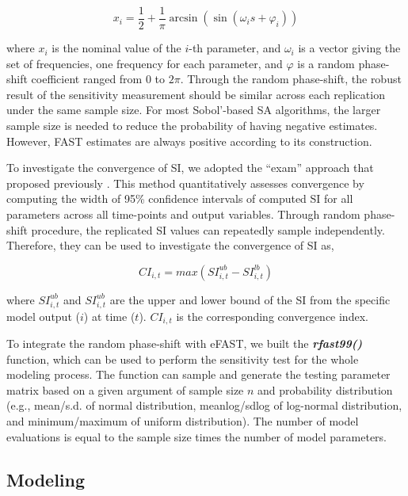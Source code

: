 \documentclass[preprint,12pt, a4paper]{elsarticle}
\begin{document}
\[ x_i = \frac{1}{2} + \frac{1}{\pi}\arcsin(\sin(\omega_is + \varphi_i)) \]


where \(x_i\) is the nominal value of the \(i\)-th parameter, and
\(\omega_i\) is a vector giving the set of frequencies, one frequency
for each parameter, and \(\varphi\) is a random phase-shift coefficient
ranged from 0 to \(2\pi\). Through the random
phase-shift, the robust result of the sensitivity measurement should be
similar across each replication under the same sample size. For most
Sobol'-based SA algorithms, the larger sample size is needed to reduce
the probability of having negative estimates. However, FAST estimates
are always positive according to its construction.

To investigate the convergence of SI, we adopted the ``exam'' approach that
proposed previously \cite{sarrazin2016global}. This method quantitatively
assesses convergence by computing the width of 95\% confidence intervals
of computed SI for all parameters across all time-points and output
variables. Through random phase-shift procedure, the replicated SI
values can repeatedly sample independently. Therefore, they can be used
to investigate the convergence of SI as,

\[CI_{i,t} = max(SI_{i,t}^{ub}-SI_{i,t}^{lb})\]

where \(SI_{i,t}^{ub}\) and \(SI_{i,t}^{ub}\) are the upper and lower
bound of the SI from the specific model output (\(i\)) at time (\(t\)).
\(CI_{i,t}\) is the corresponding convergence index.

To integrate the random phase-shift with eFAST, we built the
\textbf{\textit{rfast99()}} function, which can be used to perform the sensitivity
test for the whole modeling process. The function can sample and generate the testing parameter matrix
based on a given argument of sample size \(n\) and probability
distribution (e.g., mean/s.d. of normal distribution, meanlog/sdlog of
log-normal distribution, and minimum/maximum of uniform distribution).
The number of model evaluations is equal to the sample size times the
number of model parameters.

\subsection{Modeling}\label{modeling}
\end{document}
